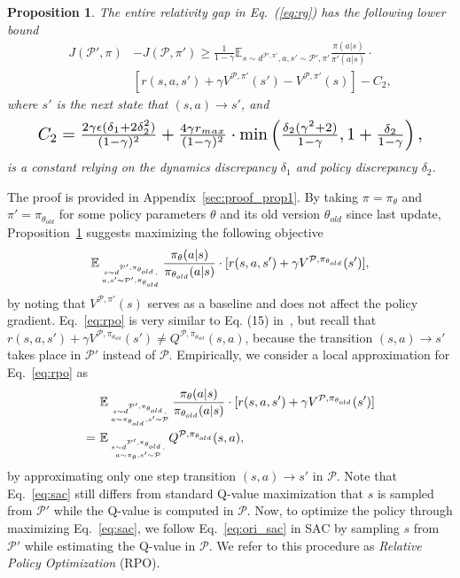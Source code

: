 \documentclass[letterpaper]{article} %
\def\E{{\mathbb{E}}}
\def\P{{\mathcal{P}}}
\newtheorem{proposition}[theorem]{Proposition}
\begin{document}
\begin{proposition}
\label{prop:1}
The entire relativity gap in Eq.~(\ref{eq:rg}) has the following lower bound
{\small
\begin{align}
J(\P',\pi)&-J(\P,\pi')\geq
\frac{1}{1-\gamma}\E_{s\sim d^{\P',\pi'} ,a,s'\sim\P',\pi'}\frac{\pi(a|s)}{\pi'(a|s)}\cdot \nonumber
\\
&[r(s,a,s')+\gamma V^{\P,\pi'}(s')-V^{\P,\pi'}(s)]
-C_2,
\end{align}
}where $s'$ is the next state that $(s,a)\xrightarrow{}s'$, and
\begin{equation}
\begin{aligned}
\resizebox{0.9\hsize}{!}{$
C_2=\frac{2\gamma\epsilon(\delta_1+2\delta_2^2)}{(1-\gamma)^2}
+
\frac{4\gamma r_{max}}{(1-\gamma)^2}
\cdot\min
\left(
\frac{\delta_2(\gamma^2+2)}{1-\gamma}, 1+\frac{\delta_2}{1-\gamma}
\right),
$}
\end{aligned}
\end{equation}
is a constant relying on the dynamics discrepancy $\delta_1$ and policy discrepancy $\delta_2$.
\end{proposition}
The proof is provided in Appendix~\ref{sec:proof_prop1}.
By taking $\pi=\pi_{\theta}$ and $\pi'=\pi_{\theta_{old}}$ for some policy parameters $\theta$ and its old version $\theta_{old}$ since last update, Proposition~\ref{prop:1} suggests maximizing the following objective
{\small
\begin{align}
\E_{
\atop{
s\sim d^{\P',\pi_{\theta_{old}}},
\atop a,s'\sim\P',\pi_{\theta_{old}}}
}
\frac{\pi_{\theta}(a|s)}{\pi_{\theta_{old}}(a|s)}\cdot
[r(s,a,s')+\gamma V^{\P,\pi_{\theta_{old}}}(s')],
\label{eq:rpo}
\end{align}
}by noting that $V^{\P,\pi'}(s)$ serves as a baseline and does not affect the policy gradient.
Eq.~\eqref{eq:rpo} is very similar to Eq. (15) in~\cite{schulman2015trust}, but
recall that $r(s,a,s')+\gamma V^{\P,\pi_{\theta_{old}}}(s')
\neq Q^{\P,\pi_{\theta_{old}}}(s,a)$,
because the transition $(s,a)\xrightarrow{}s'$ takes place in $\P'$ instead of $\P$.
Empirically, we consider a local approximation for Eq.~\eqref{eq:rpo} as
{\small
\begin{align}
&\E_{
\atop{s\sim d^{\P',\pi_{\theta_{old}}},
\atop a\sim\pi_{\theta_{old}},
s'\sim\P}
}
\frac{\pi_{\theta}(a|s)}{\pi_{\theta_{old}}(a|s)}\cdot
[r(s,a,s')+\gamma V^{\P,\pi_{\theta_{old}}}(s')]
\nonumber
\\
=\ &\E_{
\atop{s\sim d^{\P',\pi_{\theta_{old}}},
\atop a\sim\pi_{\theta},
s'\sim\P}
}
Q^{\P,\pi_{\theta_{old}}}(s,a),
\label{eq:sac}
\end{align}
}by approximating only one step transition $(s,a)\xrightarrow{}s'$ in $\P$. Note that Eq.~\eqref{eq:sac} still differs from standard Q-value maximization that $s$ is sampled from $\P'$ while the Q-value is computed in $\P$.
Now, to optimize the policy through maximizing Eq.~\eqref{eq:sac}, we follow Eq.~\eqref{eq:ori_sac} in SAC by sampling $s$ from $\P'$ while estimating the Q-value in $\P$.
We refer to this procedure as \emph{Relative Policy Optimization} (RPO).
\end{document}
